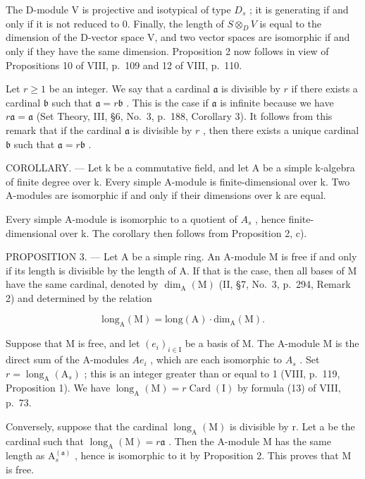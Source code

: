 The D-module V is projective and isotypical of type \(D_{s}\) ; it is generating if and only if it is not reduced to 0. Finally, the length of \(S \otimes_{D} V\) is equal to the dimension of the D-vector space V, and two vector spaces are isomorphic if and only if they have the same dimension. Proposition 2 now follows in view of Propositions 10 of VIII, p.~109 and 12 of VIII, p.~110.

Let \(r \geqslant 1\) be an integer. We say that a cardinal \(\mathfrak{a}\) is divisible by \(r\) if there exists a cardinal \(\mathfrak{b}\) such that \(\mathfrak{a} = r\mathfrak{b}\) . This is the case if \(\mathfrak{a}\) is infinite because we have \(r\mathfrak{a} = \mathfrak{a}\) (Set Theory, III, §6, No.~3, p.~188, Corollary 3). It follows from this remark that if the cardinal \(\mathfrak{a}\) is divisible by \(r\) , then there exists a unique cardinal \(\mathfrak{b}\) such that \(\mathfrak{a} = r\mathfrak{b}\) .

COROLLARY. --- Let k be a commutative field, and let A be a simple k-algebra of finite degree over k. Every simple A-module is finite-dimensional over k. Two A-modules are isomorphic if and only if their dimensions over k are equal.

Every simple A-module is isomorphic to a quotient of \(A_{s}\) , hence finite-dimensional over k. The corollary then follows from Proposition 2, c).

PROPOSITION 3. --- Let A be a simple ring. An A-module M is free if and only if its length is divisible by the length of A. If that is the case, then all bases of M have the same cardinal, denoted by \(\dim_{\mathrm{A}}(\mathrm{M})\) (II, §7, No.~3, p.~294, Remark 2) and determined by the relation

\[
\mathrm{long} _ {\mathrm{A}} (\mathrm{M}) = \mathrm{long} (\mathrm{A}) \cdot \mathrm{dim} _ {\mathrm{A}} (\mathrm{M}).\tag{1}
\]

Suppose that M is free, and let \((e_{i})_{i\in\mathrm{I}}\) be a basis of M. The A-module M is the direct sum of the A-modules \(Ae_{i}\) , which are each isomorphic to \(A_{s}\) . Set \(r=\operatorname{long}_{\mathrm{A}}(\mathrm{A}_{s})\) ; this is an integer greater than or equal to 1 (VIII, p.~119, Proposition 1). We have \(\operatorname{long}_{\mathrm{A}}(\mathrm{M})=r\operatorname{Card}(\mathrm{I})\) by formula (13) of VIII, p.~73.

Conversely, suppose that the cardinal \(\operatorname{long}_{\mathrm{A}}(\mathrm{M})\) is divisible by r. Let a be the cardinal such that \(\operatorname{long}_{\mathrm{A}}(\mathrm{M}) = r\mathfrak{a}\) . Then the A-module M has the same length as \(\mathrm{A}_{s}^{(\mathfrak{a})}\) , hence is isomorphic to it by Proposition 2. This proves that M is free.

